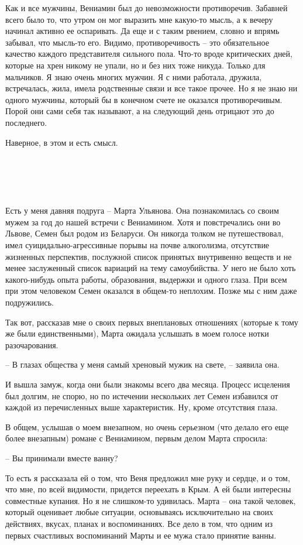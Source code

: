 \documentclass[
]{book}
\begin{document}
Как и все мужчины, Вениамин был до невозможности противоречив. Забавней всего было то, что утром он мог выразить мне какую-то мысль, а к вечеру начинал активно ее оспаривать. Да еще и с таким рвением, словно и впрямь забывал, что мысль-то его. Видимо, противоречивость -- это обязательное качество каждого представителя сильного пола. Что-то вроде критических дней, которые на хрен никому не упали, но и без них тоже никуда. Только для мальчиков. Я знаю очень многих мужчин. Я с ними работала, дружила, встречалась, жила, имела родственные связи и все такое прочее. Но я не знаю ни одного мужчины, который бы в конечном счете не оказался противоречивым. Порой они сами себя так называют, а на следующий день отрицают это до последнего.

Наверное, в этом и есть смысл.

\hypertarget{chapter-18}{%
\chapter{~}\label{chapter-18}}

Есть у меня давняя подруга -- Марта Ульянова. Она познакомилась со своим мужем за год до нашей встречи с Вениамином. Хотя и повстречались они во Львове, Семен был родом из Беларуси. Он никогда толком не путешествовал, имел суицидально-агрессивные порывы на почве алкоголизма, отсутствие жизненных перспектив, послужной список принятых внутривенно веществ и не менее заслуженный список вариаций на тему самоубийства. У него не было хоть какого-нибудь опыта работы, образования, выдержки и одного глаза. При всем при этом человеком Семен оказался в общем-то неплохим. Позже мы с ним даже подружились.

Так вот, рассказав мне о своих первых внеплановых отношениях (которые к тому же были единственными), Марта ожидала услышать в моем голосе нотки разочарования.

-- В глазах общества у меня самый хреновый мужик на свете, -- заявила она.

И вышла замуж, когда они были знакомы всего два месяца. Процесс исцеления был долгим, не спорю, но по истечении нескольких лет Семен избавился от каждой из перечисленных выше характеристик. Ну, кроме отсутствия глаза.

В общем, услышав о моем внезапном, но очень серьезном (что делало его еще более внезапным) романе с Вениамином, первым делом Марта спросила:

-- Вы принимали вместе ванну?

То есть я рассказала ей о том, что Веня предложил мне руку и сердце, и о том, что мне, по всей видимости, придется переехать в Крым. А ей были интересны совместные купания. Но я не слишком-то удивилась. Марта -- она такой человек, который оценивает любые ситуации, основываясь исключительно на своих действиях, вкусах, планах и воспоминаниях. Все дело в том, что одним из первых счастливых воспоминаний Марты и ее мужа стало принятие ванны.
\end{document}
